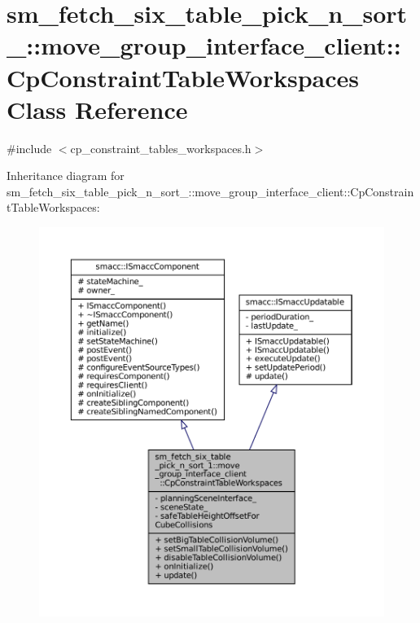\hypertarget{classsm__fetch__six__table__pick__n__sort__1_1_1move__group__interface__client_1_1CpConstraintTableWorkspaces}{}\section{sm\+\_\+fetch\+\_\+six\+\_\+table\+\_\+pick\+\_\+n\+\_\+sort\+\_\+:\+:move\+\_\+group\+\_\+interface\+\_\+client\+:\+:Cp\+Constraint\+Table\+Workspaces Class Reference}
\label{classsm__fetch__six__table__pick__n__sort__1_1_1move__group__interface__client_1_1CpConstraintTableWorkspaces}


{\ttfamily \#include $<$cp\+\_\+constraint\+\_\+tables\+\_\+workspaces.\+h$>$}



Inheritance diagram for sm\+\_\+fetch\+\_\+six\+\_\+table\+\_\+pick\+\_\+n\+\_\+sort\+\_\+:\+:move\+\_\+group\+\_\+interface\+\_\+client\+:\+:Cp\+Constraint\+Table\+Workspaces\+:
\nopagebreak
\begin{figure}[H]
\begin{center}
\leavevmode
\includegraphics[width=350pt]{classsm__fetch__six__table__pick__n__sort__1_1_1move__group__interface__client_1_1CpConstraintTableWorkspaces__inherit__graph}
\end{center}
\end{figure}


